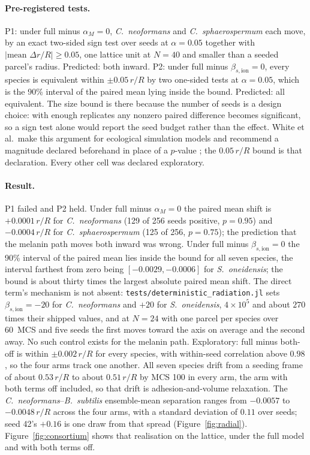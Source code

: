\documentclass[11pt]{article}
\begin{document}
\paragraph{Pre-registered tests.} P1: under full minus $\alpha_M = 0$, \textit{C.~neoformans}
and \textit{C.~sphaerospermum} each move, by an exact two-sided sign test over seeds at
$\alpha = 0.05$ together with $|\text{mean }\Delta r/R| \ge 0.05$, one lattice unit at $N = 40$
and smaller than a seeded parcel's radius. Predicted: both inward. P2: under full minus
$\beta_{s,\mathrm{ion}} = 0$, every species is equivalent within $\pm0.05\,r/R$ by two one-sided
tests at $\alpha = 0.05$, which is the 90\% interval of the paired mean lying inside the bound.
Predicted: all equivalent. The size bound is there because the number of seeds is a design
choice: with enough replicates any nonzero paired difference becomes significant, so a sign test
alone would report the seed budget rather than the effect. White et al.\ make this argument for
ecological simulation models and recommend a magnitude declared beforehand in place of a $p$-value
\cite{white2014}; the $0.05\,r/R$ bound is that declaration. Every other cell was declared
exploratory.

\paragraph{Result.} P1 failed and P2 held. Under full minus $\alpha_M = 0$ the paired mean shift
is $+0.0001\,r/R$ for \textit{C.~neoformans} (129 of 256 seeds positive, $p = 0.95$) and
$-0.0004\,r/R$ for \textit{C.~sphaerospermum} (125 of 256, $p = 0.75$); the prediction that the
melanin path moves both inward was wrong. Under full minus $\beta_{s,\mathrm{ion}} = 0$ the 90\%
interval of the paired mean lies inside the bound for all seven species, the interval farthest from zero being
$[-0.0029, -0.0006]$ for \textit{S.~oneidensis}; the bound is about thirty times the largest absolute paired mean shift. The direct term's mechanism is not absent: \texttt{tests/deterministic\_radiation.jl} sets $\beta_{s,\mathrm{ion}} = -20$ for \textit{C.~neoformans} and $+20$ for \textit{S.~oneidensis}, $4\times10^{5}$ and about $270$ times their shipped values, and at $N = 24$ with one parcel per species over 60~MCS and five seeds the first moves toward the axis on average and the second away. No such control exists for the melanin path.
Exploratory: full minus both-off is within $\pm0.002\,r/R$ for every species, with within-seed
correlation above $0.98$, so the four arms track one another. All seven species drift from a
seeding frame of about $0.53\,r/R$ to about $0.51\,r/R$ by MCS 100 in every arm, the arm with
both terms off included, so that drift is adhesion-and-volume relaxation. The
\textit{C.~neoformans}--\textit{B.~subtilis} ensemble-mean separation ranges from $-0.0057$ to $-0.0048\,r/R$ across the four arms, with a
standard deviation of $0.11$ over seeds; seed 42's $+0.16$ is one draw from that spread
(Figure~\ref{fig:radial}). Figure~\ref{fig:consortium} shows that realisation on the lattice,
under the full model and with both terms off.
\end{document}
